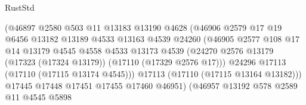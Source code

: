 \begin{lexlean}{RustStd}
\begin{coremodule}
                                      (@46897
                                        @2580
                                        @503
                                        @11
                                        @13183
                                        @13190
                                        @4628
                                        (@46906
                                          @2579
                                          @17
                                          @19
                                          @6456
                                          @13182
                                          @13189
                                          @4533
                                          @13163
                                          @4539
                                          @24260
                                          (@46905
                                            @2577
                                            @108
                                            @17
                                            @14
                                            @13179
                                            @4545
                                            @4558
                                            @4533
                                            @13173
                                            @4539
                                            (@24270
                                              @2576
                                              @13179
                                              (@17323 (@17324 @13179))
                                              (@17110 (@17329 @2576 @17)))
                                            @24296
                                            @17113
                                            (@17110 (@17115 @13174 @4545)))
                                          @17113
                                          (@17110 (@17115 @13164 @13182)))
                                        @17445
                                        @17448
                                        @17451
                                        @17455
                                        @17460
                                        @46951)
                                      (@46957
                                        @13192
                                        @578
                                        @2589
                                        @11
                                        @4545
                                        @5898

\end{coremodule}
\end{lexlean}
